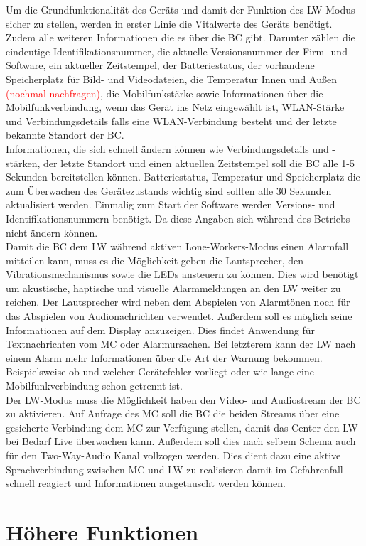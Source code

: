 \documentclass[thesis.tex]{subfiles}
\begin{document}
Um die Grundfunktionalität des Geräts und damit der Funktion des LW-Modus sicher zu stellen, werden in erster Linie
die Vitalwerte des Geräts benötigt.
Zudem alle weiteren Informationen die es über die BC gibt.
Darunter zählen die eindeutige Identifikationsnummer, die aktuelle Versionsnummer der Firm- und Software,
ein aktueller Zeitstempel, der Batteriestatus, der vorhandene Speicherplatz für Bild- und Videodateien,
die Temperatur Innen und Außen \textcolor{red}{(nochmal nachfragen)}, die Mobilfunkstärke sowie Informationen über die Mobilfunkverbindung,
wenn das Gerät ins Netz eingewählt ist, WLAN-Stärke und Verbindungsdetails falls eine WLAN-Verbindung besteht und
der letzte bekannte Standort der BC.
\\

Informationen, die sich schnell ändern können wie Verbindungsdetails und -stärken, der letzte Standort und
einen aktuellen Zeitstempel soll die BC alle 1-5 Sekunden bereitstellen können.
Batteriestatus, Temperatur und Speicherplatz die zum Überwachen des Gerätezustands wichtig sind sollten alle 30 Sekunden aktualisiert werden.
Einmalig zum Start der Software werden Versions- und Identifikationsnummern benötigt.
Da diese Angaben sich während des Betriebs nicht ändern können.
\\

Damit die BC dem LW während aktiven Lone-Workers-Modus einen Alarmfall mitteilen kann,
muss es die Möglichkeit geben die Lautsprecher, den Vibrationsmechanismus sowie die LEDs ansteuern zu können.
Dies wird benötigt um akustische, haptische und visuelle Alarmmeldungen an den LW weiter zu reichen.
Der Lautsprecher wird neben dem Abspielen von Alarmtönen noch für das Abspielen von Audionachrichten verwendet.
Außerdem soll es möglich seine Informationen auf dem Display anzuzeigen.
Dies findet Anwendung für Textnachrichten vom MC oder Alarmursachen.
Bei letzterem kann der LW nach einem Alarm mehr Informationen über die Art der Warnung bekommen.
Beispielsweise ob und welcher Gerätefehler vorliegt oder wie lange eine Mobilfunkverbindung schon getrennt ist.
\\

Der LW-Modus muss die Möglichkeit haben den Video- und Audiostream der BC zu aktivieren.
Auf Anfrage des MC soll die BC die beiden Streams über eine gesicherte Verbindung dem MC zur Verfügung stellen,
damit das Center den LW bei Bedarf Live überwachen kann.
Außerdem soll dies nach selbem Schema auch für den Two-Way-Audio Kanal vollzogen werden.
Dies dient dazu eine aktive Sprachverbindung zwischen MC und LW zu realisieren damit im Gefahrenfall schnell reagiert
und Informationen ausgetauscht werden können.

\section{Höhere Funktionen}


\subfilebib %
\end{document}
